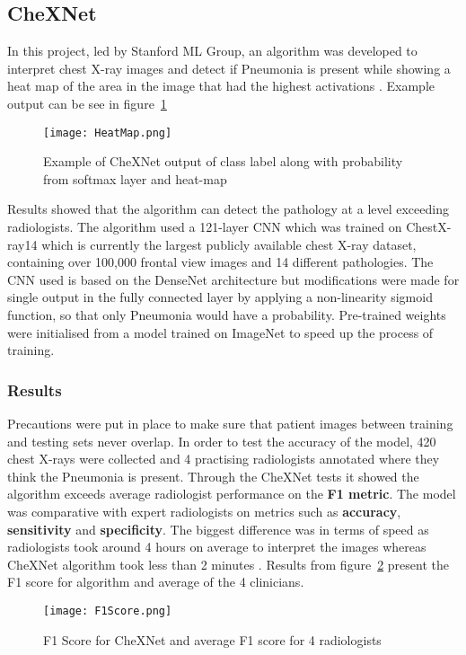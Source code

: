 \setcounter{secnumdepth}{4}

\subsection{CheXNet}
In this project, led by Stanford ML Group, an algorithm was developed to interpret chest X-ray images and detect if Pneumonia is present while showing a heat map of the area in the image that had the highest activations \cite{rajpurkar2017chexnet}. Example output can be see in figure~\ref{fig:CheXNetExample}


\begin{figure}[H]
	\centering
	\texttt{[image: HeatMap.png]}
	\caption{Example of CheXNet output of class label along with probability from softmax layer and heat-map}
	\label{fig:CheXNetExample}
\end{figure}

Results showed that the algorithm can detect the pathology at a level exceeding radiologists. The algorithm used a 121-layer CNN which was trained on ChestX-ray14 \cite{wang2017chestx} which is currently the largest publicly available chest X-ray dataset, containing over 100,000 frontal view images and 14 different pathologies. The CNN used is based on the DenseNet architecture \cite{huang2017densely} but modifications were made for single output in the fully connected layer by applying a non-linearity sigmoid function, so that only Pneumonia would have a probability. Pre-trained weights were initialised from a model trained on ImageNet \cite{deng2009imagenet} to speed up the process of training. 
\subsubsection{Results}
Precautions were put in place to make sure that patient images between training and testing sets never overlap. In order to test the accuracy of the model, 420 chest X-rays were collected and 4 practising radiologists annotated where they think the Pneumonia is present. Through the CheXNet tests it showed the algorithm exceeds average radiologist performance on the \textbf{F1 metric}. The model was comparative with expert radiologists on metrics such as \textbf{accuracy}, \textbf{sensitivity} and \textbf{specificity}. The biggest difference was in terms of speed as radiologists took around 4 hours on average to interpret the images whereas CheXNet algorithm took less than 2 minutes \cite{rajpurkar2017chexnet}. Results from figure~\ref{fig:F1Score} present the F1 score for algorithm and average of the 4 clinicians. 

\begin{figure}[H]
	\centering
	\texttt{[image: F1Score.png]}
	\caption{F1 Score for CheXNet and average F1 score for 4 radiologists}
	\label{fig:F1Score}
\end{figure}